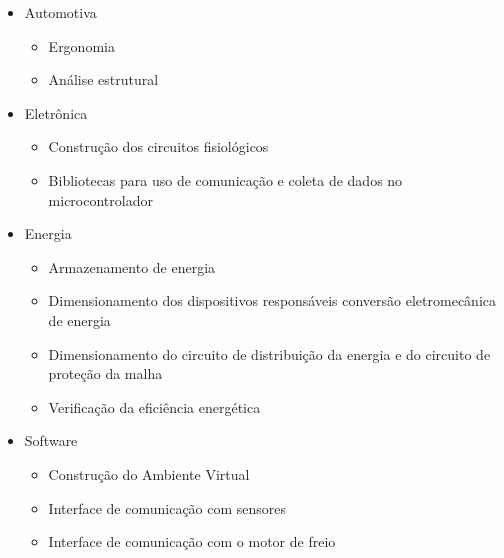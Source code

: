\begin{itemize}
	\item Automotiva
		\begin{itemize}
		\item Ergonomia
		\item Análise estrutural
		\end{itemize}
	\item Eletrônica
		\begin{itemize}
		\item Construção dos circuitos fisiológicos
		\item Bibliotecas para uso de comunicação e coleta de dados no microcontrolador
		\end{itemize}
	\item Energia
		\begin{itemize}
		\item Armazenamento de energia
		\item Dimensionamento dos dispositivos responsáveis conversão eletromecânica de energia
		\item Dimensionamento do circuito de distribuição da energia e do circuito de proteção da malha
		\item Verificação da eficiência energética
		\end{itemize}
	\item Software
		\begin{itemize}
		\item Construção do Ambiente Virtual
		\item Interface de comunicação com sensores
		\item Interface de comunicação com o motor de freio
		\end{itemize}
\end{itemize}
